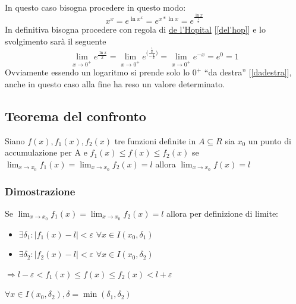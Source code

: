 \begin{description}
		In questo caso bisogna procedere in questo modo:
		\begin{equation*}
			x^x=e^{\ln{x^x}}=e^{{x*\ln x}}=e^\frac{\ln x}{\frac{1}{x}}
		\end{equation*}
		In definitiva bisogna procedere con regola di \underline{de l'Hopital} [\ref{del'hop}] e lo svolgimento sarà il seguente
		\begin{equation*}
			\lim_{x\to 0^+}e^\frac{\ln x}{x}=\lim_{x\to 0^+}e^{\bigg(\frac{\frac{1}{x}}{-\frac{1}{x}}\bigg)}=\lim_{x\to 0^+}e^{-x}=e^0=1
		\end{equation*}
		Ovviamente essendo un logaritmo si prende solo lo $0^+$ ``da destra'' [\ref{dadestra}], anche in questo caso alla fine ha reso un valore determinato.
\end{description}
\subsection{Teorema del confronto}
Siano $f(x),f_1(x),f_2(x)$ tre funzioni definite in $A\subseteq R$ sia $x_0$ un
punto di accumulazione per A e $f_1(x)\leq f(x) \leq f_2(x)$ se $\lim_{x\to
x_0}f_1(x)=\lim_{x\to x_0} f_2(x)=l$ allora $\lim_{x\to x_0} f(x)=l$
\subsubsection{Dimostrazione}
Se $\lim_{x\to x_0} f_1(x)=\lim_{x\to x_0} f_2(x)=l$ allora per definizione di
limite:
\begin{itemize}
	\item $\exists \delta_1:|f_1(x)-l|<\varepsilon$ $\forall x \in I(x_0,\delta_1)$
	\item $\exists \delta_2:|f_2(x)-l|<\varepsilon$ $\forall x \in
		I(x_0,\delta_2)$
\end{itemize}
\begin{center}
	$\Rightarrow l-\varepsilon < f_1(x) \leq f(x)\leq f_2(x) < l+ \varepsilon$
\end{center}
$\forall x \in I(x_0,\delta_2), \delta = \min (\delta_1,\delta_2)$
